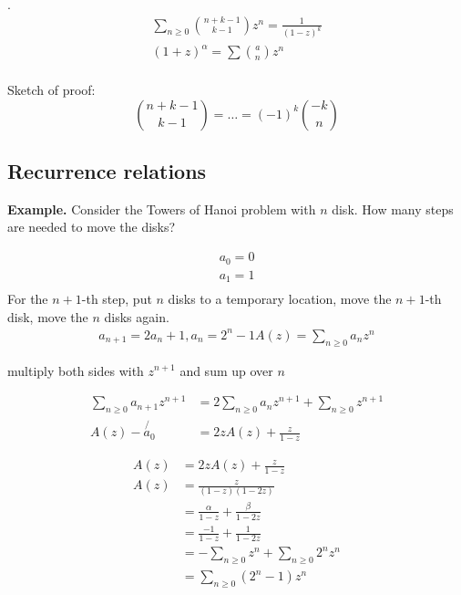\Lemma.
\begin{gather*}
    \sum_{n≥0} {\binom{n+k-1}{k-1}} z^n
    = \frac1{(1-z)^k} \\
    (1 + z)^\alpha = \sum {\binom{a}{n}} z^n \\
\end{gather*}

Sketch of proof:
\[
    {\binom{n+k-1} {k-1}} = \ldots = (-1)^k{\binom{-k}{n}}
\]


\subsection*{Recurrence relations}

\textbf{Example.}
Consider the Towers of Hanoi problem with $n$ disk. How many steps are needed to move the disks?

\begin{align*}
  a_0 = 0 \\
  a_1 = 1 \\
\end{align*}
For the $n+1$-th step, put $n$ disks to a temporary location, move the $n+1$-th disk, move the $n$ disks again.
\begin{align*}
  a_{n+1} = 2 a_n + 1, a_n = 2^n - 1
  A(z) = \sum_{n \geq 0} a_n z^n
\end{align*}

multiply both sides with $z^{n+1}$ and sum up over $n$

\begin{align*}
\sum_{n≥0} a_{n+1} z^{n+1} &= 2 \sum_{n \geq 0} a_n z^{n+1} + \sum_{n\geq 0} z^{n+1} \\
A(z) - \not{a_0}    &= 2z A(z) + \frac{z}{1-z}
\end{align*}

\begin{align*}
A(z) &= 2 z A(z) + \frac{z}{1-z}\\
A(z) &= \frac{z}{(1-z)(1-2z)} \\
    &= \frac{\alpha}{1-z} + \frac{\beta} {1-2z}\\
    &= \frac{-1}{1-z} + \frac{1}{1-2z} \\
    &= -\sum_{n\geq 0} z^n + \sum_{n\geq 0} 2^n z^n\\
    &= \sum_{n\geq 0} (2^n-1) z^n\\
\end{align*}

